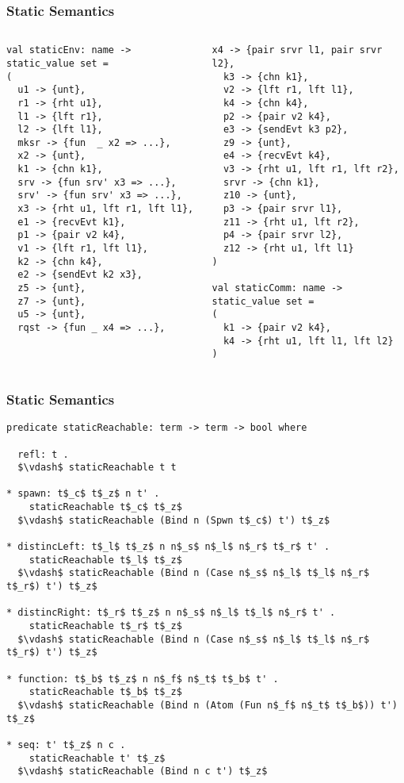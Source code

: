 \documentclass{beamer}
\begin{document}
\begin{frame}[fragile]
	\frametitle{Static Semantics}
\begin{columns}
\begin{column}{0.5\textwidth}
\begin{lstlisting}[language=sugar_lang, mathescape]
val staticEnv: name -> static_value set =
(
  u1 -> {unt},
  r1 -> {rht u1},
  l1 -> {lft r1},
  l2 -> {lft l1},
  mksr -> {fun  _ x2 => ...},
  x2 -> {unt},
  k1 -> {chn k1},
  srv -> {fun srv' x3 => ...},
  srv' -> {fun srv' x3 => ...},
  x3 -> {rht u1, lft r1, lft l1},
  e1 -> {recvEvt k1},
  p1 -> {pair v2 k4},
  v1 -> {lft r1, lft l1},
  k2 -> {chn k4},
  e2 -> {sendEvt k2 x3},
  z5 -> {unt},
  z7 -> {unt},
  u5 -> {unt},
  rqst -> {fun _ x4 => ...},
\end{lstlisting}
\end{column}

\begin{column}{0.5\textwidth}
\begin{lstlisting}[language=sugar_lang, mathescape]
  x4 -> {pair srvr l1, pair srvr l2},
  k3 -> {chn k1},
  v2 -> {lft r1, lft l1},
  k4 -> {chn k4},
  p2 -> {pair v2 k4},
  e3 -> {sendEvt k3 p2},
  z9 -> {unt},
  e4 -> {recvEvt k4},
  v3 -> {rht u1, lft r1, lft r2},
  srvr -> {chn k1},
  z10 -> {unt},
  p3 -> {pair srvr l1},
  z11 -> {rht u1, lft r2},
  p4 -> {pair srvr l2},
  z12 -> {rht u1, lft l1}
)

val staticComm: name -> static_value set =
(
  k1 -> {pair v2 k4},
  k4 -> {rht u1, lft l1, lft l2}
)
\end{lstlisting}
\end{column}
\end{columns}
\end{frame}


\begin{frame}[fragile]
	\frametitle{Static Semantics}
\begin{lstlisting}[language=logic, mathescape]
predicate staticReachable: term -> term -> bool where

  refl: t .
  $\vdash$ staticReachable t t 

* spawn: t$_c$ t$_z$ n t' . 
    staticReachable t$_c$ t$_z$
  $\vdash$ staticReachable (Bind n (Spwn t$_c$) t') t$_z$

* distincLeft: t$_l$ t$_z$ n n$_s$ n$_l$ n$_r$ t$_r$ t' . 
    staticReachable t$_l$ t$_z$
  $\vdash$ staticReachable (Bind n (Case n$_s$ n$_l$ t$_l$ n$_r$ t$_r$) t') t$_z$

* distincRight: t$_r$ t$_z$ n n$_s$ n$_l$ t$_l$ n$_r$ t' . 
    staticReachable t$_r$ t$_z$
  $\vdash$ staticReachable (Bind n (Case n$_s$ n$_l$ t$_l$ n$_r$ t$_r$) t') t$_z$

* function: t$_b$ t$_z$ n n$_f$ n$_t$ t$_b$ t' . 
    staticReachable t$_b$ t$_z$
  $\vdash$ staticReachable (Bind n (Atom (Fun n$_f$ n$_t$ t$_b$)) t') t$_z$

* seq: t' t$_z$ n c . 
    staticReachable t' t$_z$
  $\vdash$ staticReachable (Bind n c t') t$_z$
\end{lstlisting}
\end{frame}
\end{document}
